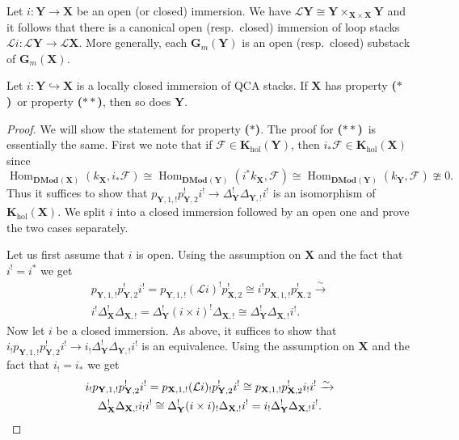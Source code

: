 \documentclass{oupau}
\theoremstyle{remark}
\let\stack\mathbf                           %
\newcommand\cat{\mathbf}                    %
\DeclareMathOperator\Hom{Hom}
\newcommand\isoto{\xrightarrow{\sim}}       %
\newcommand\sheaf\mathcal
\newcommand\catDMod[2][]{\cat{DMod}_{#1}(#2)}   %
\newcommand\bc{\textbf{($\mathbf{*}$)}}
\newcommand\hbc{\textbf{($\mathbf{**}$)}}
\newcommand\catK[2][]{\cat{K}_{#1}(#2)}
\newcommand\catKHol[1]{\catK[\mathrm{hol}]{#1}}
\newcommand\ls[1]{\mathcal{L} #1}
\begin{document}
Let $i\colon\stack Y \to \stack X$ be an open (or closed) immersion.
We have $\ls \stack Y \cong \stack Y \times_{\stack X \times \stack X} \stack Y$ and it follows that there is a canonical open (resp.~closed) immersion of loop stacks $\ls i\colon \ls \stack Y \to \ls \stack X$.
More generally, each $\stack G_m(\stack Y)$ is an open (resp.~closed) substack of $\stack G_m(\stack X)$.

\begin{lemma}\label{lem:lc_immersion}
    Let $i\colon\stack Y \hookrightarrow \stack X$ is a locally closed immersion of QCA stacks.
    If $\stack X$ has property \bc\ or property \hbc, then so does $\stack Y$.
\end{lemma}

\begin{proof}
    We will show the statement for property \bc.
    The proof for \hbc\ is essentially the same.
    First we note that if $\sheaf F \in \catKHol{\stack Y}$, then $i_*\sheaf F \in \catKHol{\stack X}$ since
    \[
      \Hom_{\catDMod{\stack X}}(k_{\stack X}, i_*\sheaf F) \cong
      \Hom_{\catDMod{\stack Y}}(i^*k_{\stack X}, \sheaf F) \cong
      \Hom_{\catDMod{\stack Y}}(k_{\stack Y}, \sheaf F) \ncong 0.
    \]
    Thus it suffices to show that $p_{\stack Y,1,!}p_{\stack Y,2}^!i^! \to \Delta_{\stack Y}^!\Delta_{\stack Y,!}i^!$ is an isomorphism of $\catKHol{\stack X}$.
    We split $i$ into a closed immersion followed by an open one and prove the two cases separately.

    Let us first assume that $i$ is open.
    Using the assumption on $\stack X$ and the fact that $i^! = i^*$ we get
    \begin{multline*}
        p_{\stack Y,1,!} p_{\stack Y,2}^!i^! =
        p_{\stack Y,1,!} (\ls i)^! p_{\stack X,2}^! \cong
        i^! p_{\stack X,1,!} p_{\stack X,2}^! \isoto \\
        i^! \Delta_{\stack X}^! \Delta_{\stack X,!} =
        \Delta_{\stack Y}^! (i\times i)^! \Delta_{\stack X,!} \cong
        \Delta_{\stack Y}^! \Delta_{\stack X,!} i^!.
    \end{multline*}
    Now let $i$ be a closed immersion.
    As above, it suffices to show that $i_!p_{\stack Y,1,!}p_{\stack Y,2}^!i^! \to i_!\Delta_{\stack Y}^!\Delta_{\stack Y,!}i^!$ is an equivalence.
    Using the assumption on $\stack X$ and the fact that $i_! = i_*$ we get
    \begin{multline*}
        i_! p_{\stack Y,1,!} p_{\stack Y,2}^!i^! =
        p_{\stack X,1,!} (\ls i)_! p_{\stack Y,2}^!i^! \cong
        p_{\stack X,1,!} p_{\stack X,2}^! i_!i^! \isoto \\
        \Delta_{\stack X}^! \Delta_{\stack X,!} i_!i^! \cong
        \Delta_{\stack Y}^! (i\times i)_! \Delta_{\stack X,!}i^! =
        i_! \Delta_{\stack Y}^! \Delta_{\stack X,!} i^!.
        \qedhere
    \end{multline*}
\end{proof}
\end{document}
